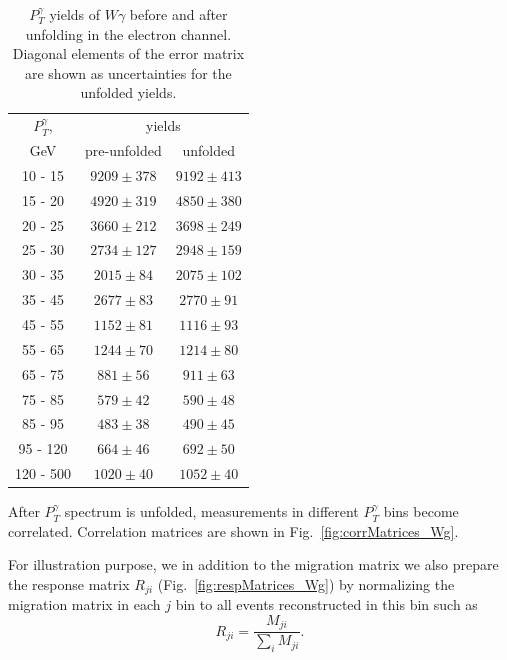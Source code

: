\begin{table}[h]
  \scriptsize
  \begin{center}
  \caption{$P_T^{\gamma}$ yields of $W\gamma$ before and after unfolding in the electron channel. Diagonal elements of the error matrix are shown as uncertainties for the unfolded yields.}
  \begin{tabular}{|c|c|c|}

  $P_T^{\gamma}$, &    \multicolumn{2}{|c|}{yields}  \\ 
  GeV           &  pre-unfolded &  unfolded  \\ \hline

 10 -  15 &     $9209\pm 378$ &     $9192\pm 413$  \\ \hline
 15 -  20 &     $4920\pm 319$ &     $4850\pm 380$  \\ \hline
 20 -  25 &     $3660\pm 212$ &     $3698\pm 249$  \\ \hline
 25 -  30 &     $2734\pm 127$ &     $2948\pm 159$  \\ \hline
 30 -  35 &     $2015\pm  84$ &     $2075\pm 102$  \\ \hline
 35 -  45 &     $2677\pm  83$ &     $2770\pm  91$  \\ \hline
 45 -  55 &     $1152\pm  81$ &     $1116\pm  93$  \\ \hline
 55 -  65 &     $1244\pm  70$ &     $1214\pm  80$  \\ \hline
 65 -  75 &     $881\pm  56$ &     $911\pm  63$  \\ \hline
 75 -  85 &     $579\pm  42$ &     $590\pm  48$  \\ \hline
 85 -  95 &     $483\pm  38$ &     $490\pm  45$  \\ \hline
 95 - 120 &     $664\pm  46$ &     $692\pm  50$  \\ \hline
120 - 500 &     $1020\pm  40$ &     $1052\pm  40$  \\ \hline
  \end{tabular}
  \label{tab:unf_results_ELECTRON_WGamma}
  \end{center}
\end{table}

After $P_T^{\gamma}$ spectrum is unfolded, measurements in different $P_T^{\gamma}$ bins become correlated. Correlation matrices are shown in Fig.~\ref{fig:corrMatrices_Wg}. 

For illustration purpose, we in addition to the migration matrix we also prepare the response matrix $R_{ji}$ (Fig.~\ref{fig:respMatrices_Wg}) by normalizing the migration matrix in each $j$ bin to all events reconstructed in this bin such as 
\begin{equation}
R_{ji} = \frac{M_{ji}}{\sum_{i} M_{ji}}. 
\end{equation}


